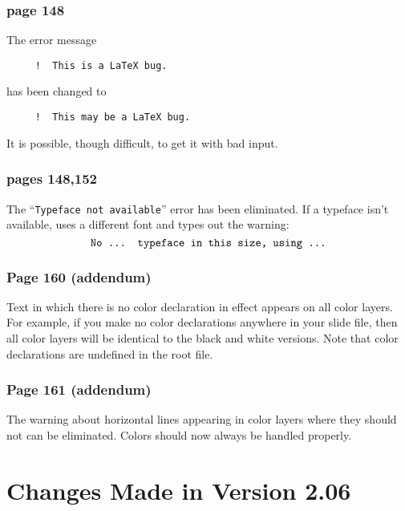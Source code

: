 \subsubsection*{page 148}
The error message
\begin{verbatim}
     !  This is a LaTeX bug.
\end{verbatim}
has been changed to
\begin{verbatim}
     !  This may be a LaTeX bug.
\end{verbatim}
It is possible, though difficult, to get it with bad input.

\subsubsection*
{pages 148,152}
The ``{\tt Typeface not available}'' error has been eliminated.  If a
typeface isn't available, \LATEX{} uses a different font and types out
the warning:
\[  \mbox{\tt No ... typeface in this size, using ...}\] 

\subsubsection*{Page 160 (addendum)}
Text in which there is no color declaration in effect appears on all
color layers.  For example, if you make no color declarations anywhere
in your slide file, then all color layers will be identical to the
black and white versions.  Note that color declarations are undefined
in the root file.

\subsubsection*{Page 161 (addendum)}
The warning about horizontal lines appearing in color layers where
they should not can be eliminated.  Colors should now always be
handled properly.

\section*{Changes Made in Version 2.06}

